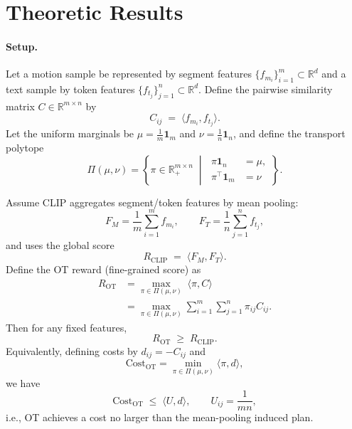 
\section{Theoretic Results}
\label{sec:expressiveness}

\paragraph{Setup.}
Let a motion sample be represented by segment features
$\{f_{m_i}\}_{i=1}^m \subset \mathbb{R}^d$
and a text sample by token features
$\{f_{t_j}\}_{j=1}^n \subset \mathbb{R}^d$.
Define the pairwise similarity matrix
$C\in\mathbb{R}^{m\times n}$ by
\[
C_{ij}
\;=\;
\langle f_{m_i}, f_{t_j}\rangle .
\]
Let the uniform marginals be
$\mu = \frac{1}{m}\mathbf{1}_m$
and
$\nu = \frac{1}{n}\mathbf{1}_n$,
and define the transport polytope
\[
\Pi(\mu,\nu)
=
\left\{
\pi\in\mathbb{R}_+^{m\times n}
\;\middle|\;
\begin{aligned}
\pi\mathbf{1}_n &= \mu, \\
\pi^\top \mathbf{1}_m &= \nu
\end{aligned}
\right\}.
\]

\begin{theorem}
\label{thm:ot_ge_mean}
Assume CLIP aggregates segment/token features by mean pooling:
\[
F_M=\frac{1}{m}\sum_{i=1}^m f_{m_i},
\qquad
F_T=\frac{1}{n}\sum_{j=1}^n f_{t_j},
\]
and uses the global score
\[
R_{\mathrm{CLIP}}
\;=\;
\langle F_M, F_T\rangle .
\]
Define the OT reward (fine-grained score) as
\[
\begin{aligned}
R_{\mathrm{OT}}
&=
\max_{\pi\in\Pi(\mu,\nu)}
\;\langle \pi, C\rangle \\
&=
\max_{\pi\in\Pi(\mu,\nu)}
\sum_{i=1}^m
\sum_{j=1}^n
\pi_{ij} C_{ij}.
\end{aligned}
\]
Then for any fixed features,
\[
R_{\mathrm{OT}}
\;\ge\;
R_{\mathrm{CLIP}}.
\]
Equivalently, defining costs by
$d_{ij}=-C_{ij}$ and
\[
\mathrm{Cost}_{\mathrm{OT}}
=
\min_{\pi\in\Pi(\mu,\nu)}
\langle \pi, d\rangle ,
\]
we have
\[
\mathrm{Cost}_{\mathrm{OT}}
\;\le\;
\langle U, d\rangle ,
\qquad
U_{ij}=\frac{1}{mn},
\]
i.e., OT achieves a cost no larger than the
mean-pooling induced plan.
\end{theorem}

